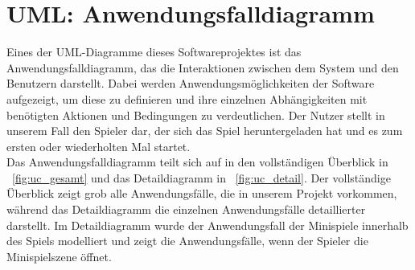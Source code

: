 \chapter{UML: Anwendungsfalldiagramm}\label{ch:uml_uc}
Eines der UML-Diagramme dieses Softwareprojektes ist das Anwendungsfalldiagramm, 
das die Interaktionen zwischen dem System und den Benutzern darstellt. 
Dabei werden Anwendungsmöglichkeiten der Software aufgezeigt, um diese zu definieren und ihre einzelnen Abhängigkeiten 
mit benötigten Aktionen und Bedingungen zu verdeutlichen.
Der Nutzer stellt in unserem Fall den Spieler dar, der sich das Spiel heruntergeladen hat und es zum ersten oder 
wiederholten Mal startet.\\
\newline
Das Anwendungsfalldiagramm teilt sich auf in den vollständigen Überblick in ~\autoref{fig:uc_gesamt} und das 
Detaildiagramm in ~\autoref{fig:uc_detail}.
Der vollständige Überblick zeigt grob alle Anwendungsfälle, die in unserem Projekt vorkommen,
während das Detaildiagramm die einzelnen Anwendungsfälle detaillierter darstellt. 
Im Detaildiagramm wurde der Anwendungsfall der Minispiele innerhalb des Spiels modelliert und zeigt die Anwendungsfälle,
wenn der Spieler die Minispielszene öffnet. \\

